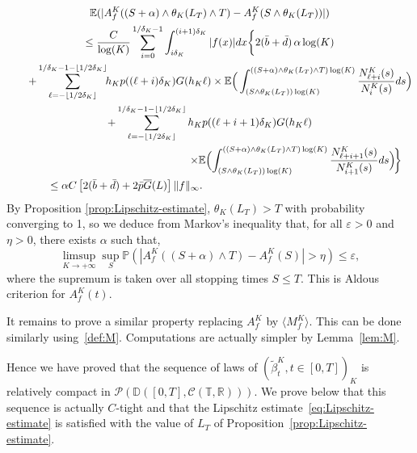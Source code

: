 \documentclass[10pt]{amsart}
\let\cal\mathcal
\theoremstyle{plain}
\theoremstyle{remark}
\renewcommand\P{\mathbb{P}}
\begin{document}
\begin{multline*}
\mathbb{E}(|A^K_{f}((S+\alpha)\wedge\theta_K(L_T)\wedge T) -A^K_{f} (S\wedge\theta_K(L_T))|) \\
 \leq {C\over \log(K)}\sum_{i=0}^{1/\delta_K-1} \int_{i\delta_{K}}^{(i+1)\delta_{K}} |f(x)|dx\bigg\{ 2(\bar b+\bar d)\,\alpha\log(K)\\ 
 \qquad+ \sum_{\ell=-\lfloor 1/2\delta_K\rfloor}^{1/\delta_K-1-\lfloor 1/2\delta_K\rfloor}\hspace*{-3pt}h_Kp((\ell+i)\delta_K)G(h_K\ell)\times \mathbb{E}\Big(\int_{(S\wedge\theta_K(L_T)) \log(K)}^{((S+\alpha)\wedge\theta_K(L_T)\wedge T)\log(K)} {N^K_{\ell+i}(s)\over N^K_{i}(s)}ds\Bigr)\\
 + \sum_{\ell=-\lfloor 1/2\delta_K\rfloor}^{1/\delta_K-1-\lfloor 1/2\delta_K\rfloor}h_Kp((\ell+i+1)\delta_K)G(h_K\ell) \\
\shoveright{\times \mathbb{E}\Bigl(\int_{(S\wedge\theta_K(L_T)) \log(K)}^{((S+\alpha)\wedge\theta_K(L_T)\wedge T)\log(K)} {N^K_{\ell+i+1}(s)\over N^K_{i+1}(s)}ds\Bigr)\!\biggr\}}\\
\leq \alpha C\left[2(\bar b+\bar d)+2\bar p\overline{G}(L) \right]\|f\|_\infty.\hspace*{5.5cm} 
\end{multline*}
By Proposition \ref{prop:Lipschitz-estimate}, $\theta_K(L_T)>T$ with probability converging to 1, so we deduce from Markov's inequality that, for all $\varepsilon>0$ and $\eta>0$, there exists $\alpha$ such that,
\[
\limsup_{K\to+\infty}\sup_S\P(|A^K_{f}((S+\alpha)\wedge T) -A^K_{f} (S)|>\eta)\leq\varepsilon,
\]
where the supremum is taken over all stopping times $S\leq T$. This is Aldous criterion for $A^K_{f}(t)$.

It remains to prove a similar property replacing $A^K_{f}$ by $\langle M^K_{f} \rangle$. This can be done similarly using~\eqref{def:M}. Computations are actually simpler by Lemma~\ref{lem:M}.

Hence we have proved that the sequence of laws of $(\tilde \beta^K_{t}, t\in[0,T])_{K}$ is relatively compact in ${\cal P}(\mathbb{D}([0,T],{\cal C}(\mathbb{T},\mathbb{R})))$. We prove below that this sequence is actually $C$-tight and that the Lipschitz estimate~\eqref{eq:Lipschitz-estimate} is satisfied with the value of $L_T$ of Proposition~\ref{prop:Lipschitz-estimate}.
\end{document}

